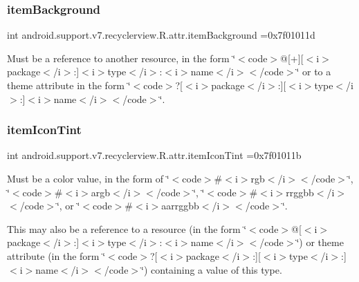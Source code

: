 \subsubsection{\texorpdfstring{item\+Background}{itemBackground}}
{\footnotesize\ttfamily int android.\+support.\+v7.\+recyclerview.\+R.\+attr.\+item\+Background =0x7f01011d\hspace{0.3cm}{\ttfamily [static]}}

Must be a reference to another resource, in the form \char`\"{}$<$code$>$@\mbox{[}+\mbox{]}\mbox{[}$<$i$>$package$<$/i$>$\+:\mbox{]}$<$i$>$type$<$/i$>$\+:$<$i$>$name$<$/i$>$$<$/code$>$\char`\"{} or to a theme attribute in the form \char`\"{}$<$code$>$?\mbox{[}$<$i$>$package$<$/i$>$\+:\mbox{]}\mbox{[}$<$i$>$type$<$/i$>$\+:\mbox{]}$<$i$>$name$<$/i$>$$<$/code$>$\char`\"{}. \mbox{\label{classandroid_1_1support_1_1v7_1_1recyclerview_1_1R_1_1attr_acd2c70fe15fe46dd07b3a2387b55f306}} 
\subsubsection{\texorpdfstring{item\+Icon\+Tint}{itemIconTint}}
{\footnotesize\ttfamily int android.\+support.\+v7.\+recyclerview.\+R.\+attr.\+item\+Icon\+Tint =0x7f01011b\hspace{0.3cm}{\ttfamily [static]}}

Must be a color value, in the form of \char`\"{}$<$code$>$\#$<$i$>$rgb$<$/i$>$$<$/code$>$\char`\"{}, \char`\"{}$<$code$>$\#$<$i$>$argb$<$/i$>$$<$/code$>$\char`\"{}, \char`\"{}$<$code$>$\#$<$i$>$rrggbb$<$/i$>$$<$/code$>$\char`\"{}, or \char`\"{}$<$code$>$\#$<$i$>$aarrggbb$<$/i$>$$<$/code$>$\char`\"{}. 

This may also be a reference to a resource (in the form \char`\"{}$<$code$>$@\mbox{[}$<$i$>$package$<$/i$>$\+:\mbox{]}$<$i$>$type$<$/i$>$\+:$<$i$>$name$<$/i$>$$<$/code$>$\char`\"{}) or theme attribute (in the form \char`\"{}$<$code$>$?\mbox{[}$<$i$>$package$<$/i$>$\+:\mbox{]}\mbox{[}$<$i$>$type$<$/i$>$\+:\mbox{]}$<$i$>$name$<$/i$>$$<$/code$>$\char`\"{}) containing a value of this type. \mbox{\label{classandroid_1_1support_1_1v7_1_1recyclerview_1_1R_1_1attr_a56df4a1bb8fa893c7a683535e4583dbf}} 
